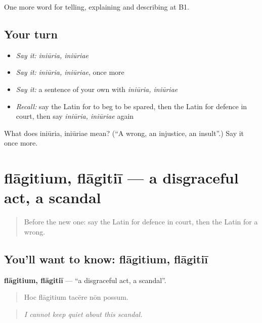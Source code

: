 \begin{grammarlens}[title={What you've built}]
One more word for telling, explaining and describing at B1.
\end{grammarlens}

\subsection*{Your turn}
\begin{itemize}
\raggedright
  \item \emph{Say it:} \emph{iniūria, iniūriae}
  \item \emph{Say it:} \emph{iniūria, iniūriae}, once more
  \item \emph{Say it:} a sentence of your own with \emph{iniūria, iniūriae}
  \item \emph{Recall:} say the Latin for to beg to be spared, then the Latin for defence in court, then say \emph{iniūria, iniūriae} again
\end{itemize}

\begin{tcolorbox}[breakable,colback=teal!4,colframe=teal!35!black,title={Before you move on}]
What does iniūria, iniūriae mean? (\textquotedblleft{}A wrong, an injustice, an insult\textquotedblright{}.) Say it once more.
\end{tcolorbox}
\section[flāgitium, flāgitiī]{flāgitium, flāgitiī — a disgraceful act, a scandal}

\label{lesson:LA-C414-flagitium}



\begin{quote}
Before the new one: say the Latin for defence in court, then the Latin for a wrong.
\end{quote}

\subsection*{You'll want to know: flāgitium, flāgitiī}
\textbf{flāgitium, flāgitiī} — \textquotedblleft{}a disgraceful act, a scandal\textquotedblright{}.

\begin{quote}
Hoc flāgitium tacēre nōn possum.
\end{quote}

\begin{quote}
\emph{I cannot keep quiet about this scandal.}
\end{quote}

